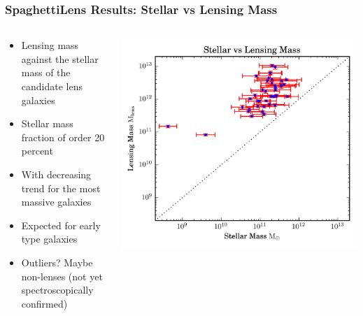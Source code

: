 \documentclass{beamer}
\begin{document}
 \begin{frame}
   \frametitle{SpaghettiLens Results: Stellar vs Lensing Mass}

   \begin{columns}[c]
   \begin{column}{0.5\textwidth}
     \begin{itemize}
       \item Lensing mass against the stellar mass of the candidate lens galaxies
       \item Stellar mass fraction of order 20 percent
       \item With decreasing trend for the most massive galaxies
       \item Expected for early type galaxies
       \item Outliers? Maybe non-lenses (not yet spectroscopically confirmed)
     \end{itemize}
 
   \end{column}\begin{column}{0.5\textwidth}
     \includegraphics[width=\textwidth]{imgs/plot}
   \end{column}
   \end{columns}

 \end{frame}
\end{document}
